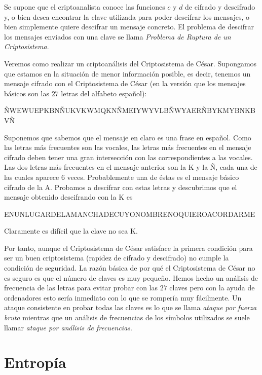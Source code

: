 Se supone que el criptoanalista conoce las funciones $c$ y $d$ de cifrado y descifrado y, o bien desea encontrar la clave utilizada para poder descifrar los mensajes, o bien simplemente quiere descifrar un mensaje concreto. El problema de descifrar los mensajes enviados con una clave se llama {\it Problema de Ruptura de un Criptosistema}.

Veremos como realizar un criptoanálisis del Criptosistema de César. Supongamos que estamos en la situación de menor información posible, es decir, tenemos un mensaje cifrado con el Criptosistema de César (en la versión que los mensajes básicos son las $27$ letras del alfabeto español):
\begin{center}
    ÑWEWUEPKBNÑUKVKWMQKNÑMEIYWYVLBÑWYAERÑBYKMYBNKBVÑ
\end{center}
Suponemos que sabemos que el mensaje en claro es una frase en español. Como las letras más frecuentes son las vocales, las letras más frecuentes en el mensaje cifrado deben tener una gran intersección con las correspondientes a las vocales. Las dos letras más frecuentes en el mensaje anterior son la K y la Ñ, cada una de las cuales aparece $6$ veces. Probablemente una de éstas es el mensaje básico cifrado de la A. Probamos a descifrar con estas letras y descubrimos que el mensaje obtenido descifrando con la K es
\begin{center}
    ENUNLUGARDELAMANCHADECUYONOMBRENOQUIEROACORDARME
\end{center}
Claramente es difícil que la clave no sea K.

Por tanto, aunque el Criptosistema de César satisface la primera condición para ser un buen criptosistema (rapidez de cifrado y descifrado) no cumple la condición de seguridad. La razón básica de por qué el Criptosistema de César no es seguro es que el número de claves es muy pequeño. Hemos hecho un análisis de frecuencia de las letras para evitar probar con las $27$ claves pero con la ayuda de ordenadores esto sería inmediato con lo que se rompería muy fácilmente. Un ataque consistente en probar todas las claves es lo que se llama {\it ataque por fuerza bruta} mientras que un análisis de frecuencias de los símbolos utilizados se suele llamar {\it ataque por análisis de frecuencias}.
\section{Entropía}

